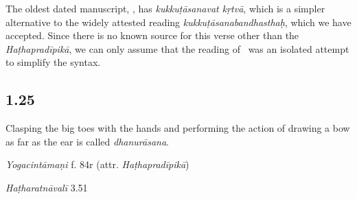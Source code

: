 \begin{ekdosis}
\begin{testimonia}[hp01_024]
\begin{versinnote}
\end{versinnote}

\end{testimonia}

\begin{philcomm}[hp01_024]
The oldest dated manuscript, \etaOne, has \emph{kukkuṭāsanavat kṛtvā}, which is a simpler alternative to the widely attested reading \emph{kukkuṭāsanabandhasthaḥ}, which we have accepted. Since there is no known source for this verse other than the \emph{Haṭhapradīpikā}, we can only assume that the reading of \etaOne\ was an isolated attempt to simplify the syntax.%
\end{philcomm}

\subsection*{1.25}
\begin{translation}[hp01_025]
Clasping the big toes with the hands and performing the action of drawing a bow as far as the ear is called \emph{dhanurāsana}.
\end{translation}

\begin{testimonia}[hp01_025]
\emph{Yogacintāmaṇi} f. 84r (attr. \emph{Haṭhapradīpikā})

\begin{versinnote}
\end{versinnote}

\emph{Haṭharatnāvalī} 3.51

\begin{versinnote}
\tl{\var{ākarṣaṇaṃ kṛtvā ] ākarṣaṇākṛṣṭaṃ P,T,t1}\\!}
\end{versinnote}


\end{testimonia}
\end{ekdosis}
